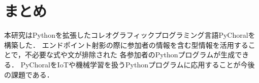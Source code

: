 \documentclass{resume}
\begin{document}
\section{まとめ}

本研究はPythonを拡張したコレオグラフィックプログラミング言語PyChoralを構築した．
エンドポイント射影の際に参加者の情報を含む型情報を活用することで，不必要な式や文が排除された
各参加者のPythonプログラムが生成できる．
PyChoralをIoTや機械学習を扱うPythonプログラムに応用することが今後の課題である．



\end{document}
